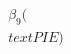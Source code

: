 \documentclass[preview]{standalone}
\begin{document}
\begin{align*}
\beta_9(\\text{PIE})
\end{align*}
\end{document}
